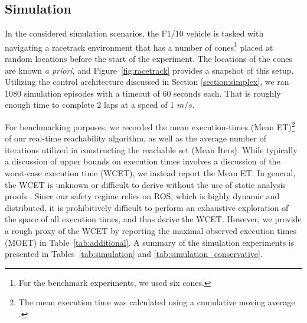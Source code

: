 \documentclass[manuscript,screen,review]{acmart}
\begin{document}
\subsection{Simulation}
In the considered simulation scenarios, the F1/10 vehicle is tasked with navigating a racetrack environment that has a number of cones\footnote{For the benchmark experiments, we used six cones.} placed at random locations before the start of the experiment. The locations of the cones are known \emph{a priori}, and Figure~\ref{fig:racetrack} provides a snapshot of this setup. Utilizing the control architecture discussed in Section \ref{section:simplex}, we ran 1080 simulation episodes with a timeout of 60 seconds each. That is roughly enough time to complete 2 laps at a speed of 1 $m/s$. %


For benchmarking purposes, we recorded the mean execution-times (Mean ET)\footnote{The mean execution time was calculated using a cumulative moving average \cite{Jin2019}.} of our real-time reachability algorithm, as well as the average number of iterations utilized in constructing the reachable set (Mean Iters). While typically a discussion of upper bounds on execution times involves a discussion of the worst-case execution time (WCET), we instead report the Mean ET. In general, the WCET is unknown or difficult to derive without the use of static analysis proofs \cite{Reinhard2008}. Since our safety regime relies on ROS, which is highly dynamic and distributed, it is prohibitively difficult to perform an exhaustive exploration of the space of all execution times, and thus derive the WCET.  However, we provide a rough proxy of the WCET by reporting the maximal observed execution times (MOET)  \cite{Reinhard2008} in Table~\ref{tab:additional}. %
A summary of the simulation experiments is presented in Tables~\ref{tab:simulation} and \ref{tab:simulation_conservative}.
\end{document}
